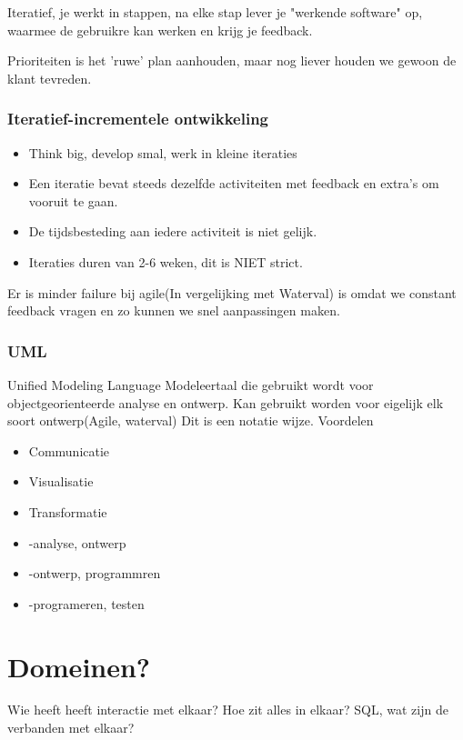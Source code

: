 \documentclass{article}
\begin{document}
Iteratief, je werkt in stappen, na elke stap lever je "werkende software" op, waarmee de gebruikre kan werken en krijg je feedback.

Prioriteiten is het 'ruwe' plan aanhouden, maar nog liever houden we gewoon de klant tevreden.

\subsubsection{Iteratief-incrementele ontwikkeling}
\begin{itemize}
\item Think big, develop smal, werk in kleine iteraties
\item Een iteratie bevat steeds dezelfde activiteiten met feedback en extra's om vooruit te gaan.
\item De tijdsbesteding aan iedere activiteit is niet gelijk.
\item Iteraties duren van 2-6 weken, dit is NIET strict.
\end{itemize}
Er is minder failure bij agile(In vergelijking met Waterval) is omdat we constant feedback vragen en zo kunnen we snel aanpassingen maken.

\subsubsection{UML}
Unified Modeling Language
Modeleertaal die gebruikt wordt voor objectgeorienteerde analyse en ontwerp.
Kan gebruikt worden voor eigelijk elk soort ontwerp(Agile, waterval) Dit is een notatie wijze.
Voordelen
\begin{itemize}
\item Communicatie
\item Visualisatie
\item Transformatie
\item	-analyse, ontwerp
\item	-ontwerp, programmren
\item	-programeren, testen
\end{itemize}
\section{Domeinen?}
Wie heeft heeft interactie met elkaar? Hoe zit alles in elkaar? SQL, wat zijn de verbanden met elkaar?
\end{document}
